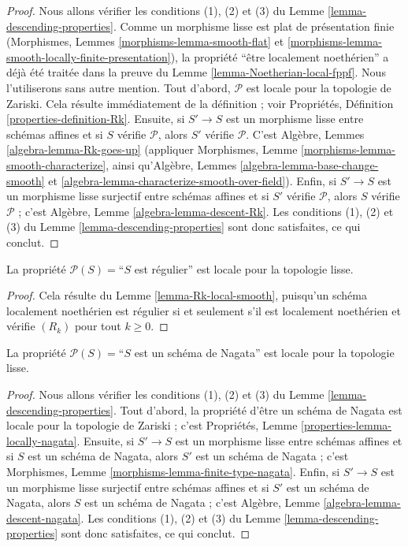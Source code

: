 \begin{proof}
Nous allons vérifier les conditions (1), (2) et (3) du Lemme
\ref{lemma-descending-properties}. Comme un morphisme lisse est plat de
présentation finie (Morphismes, Lemmes \ref{morphisms-lemma-smooth-flat} et
\ref{morphisms-lemma-smooth-locally-finite-presentation}), la propriété
``être localement noethérien'' a déjà été traitée dans la preuve du
Lemme \ref{lemma-Noetherian-local-fppf}. Nous l'utiliserons sans autre
mention. Tout d'abord, $\mathcal{P}$ est locale pour la topologie de Zariski.
Cela résulte immédiatement de la définition ; voir Propriétés, Définition
\ref{properties-definition-Rk}. Ensuite, si $S' \to S$ est un morphisme
lisse entre schémas affines et si $S$ vérifie $\mathcal{P}$, alors $S'$
vérifie $\mathcal{P}$. C'est Algèbre, Lemmes
\ref{algebra-lemma-Rk-goes-up} (appliquer Morphismes, Lemme
\ref{morphisms-lemma-smooth-characterize}, ainsi qu'Algèbre, Lemmes
\ref{algebra-lemma-base-change-smooth} et
\ref{algebra-lemma-characterize-smooth-over-field}). Enfin, si $S' \to S$
est un morphisme lisse surjectif entre schémas affines et si $S'$ vérifie
$\mathcal{P}$, alors $S$ vérifie $\mathcal{P}$ ; c'est Algèbre, Lemme
\ref{algebra-lemma-descent-Rk}. Les conditions (1), (2) et (3) du
Lemme \ref{lemma-descending-properties} sont donc satisfaites, ce qui conclut.
\end{proof}

\begin{lemma}
\label{lemma-regular-local-smooth}
La propriété $\mathcal{P}(S) =$``$S$ est régulier'' est locale pour la
topologie lisse.
\end{lemma}

\begin{proof}
Cela résulte du Lemme \ref{lemma-Rk-local-smooth}, puisqu'un schéma localement
noethérien est régulier si et seulement s'il est localement noethérien et
vérifie $(R_k)$ pour tout $k \geq 0$.
\end{proof}

\begin{lemma}
\label{lemma-Nagata-local-smooth}
La propriété $\mathcal{P}(S) =$``$S$ est un schéma de Nagata'' est locale pour
la topologie lisse.
\end{lemma}

\begin{proof}
Nous allons vérifier les conditions (1), (2) et (3) du Lemme
\ref{lemma-descending-properties}. Tout d'abord, la propriété d'être un schéma
de Nagata est locale pour la topologie de Zariski ; c'est Propriétés, Lemme
\ref{properties-lemma-locally-nagata}. Ensuite, si $S' \to S$ est un
morphisme lisse entre schémas affines et si $S$ est un schéma de Nagata,
alors $S'$ est un schéma de Nagata ; c'est Morphismes, Lemme
\ref{morphisms-lemma-finite-type-nagata}. Enfin, si $S' \to S$ est un
morphisme lisse surjectif entre schémas affines et si $S'$ est un schéma de
Nagata, alors $S$ est un schéma de Nagata ; c'est Algèbre, Lemme
\ref{algebra-lemma-descent-nagata}. Les conditions (1), (2) et (3) du
Lemme \ref{lemma-descending-properties} sont donc satisfaites, ce qui conclut.
\end{proof}





